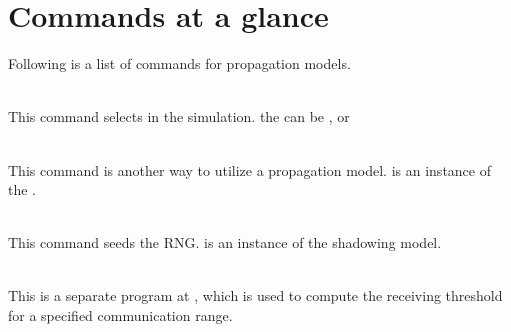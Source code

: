 
\section{Commands at a glance}
\label{sec:propcommand}

Following is a list of commands for propagation models.

\begin{flushleft}
\\
This command selects  in the simulation. the
 can be ,
 or 

\\
This command is another way to utilize a propagation model.  is
an instance of the .

\\
This command seeds the RNG.  is an instance of the shadowing model.

\\
This is a separate program at , which
is used to compute the receiving threshold for a specified communication range.

\end{flushleft}

\endinput

















